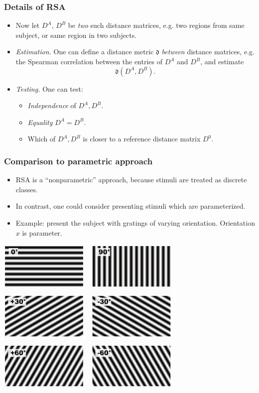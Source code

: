 \documentclass{beamer}
\begin{document}
\begin{frame}
\frametitle{Details of RSA}
\begin{itemize}
\item Now let $D^A$, $D^B$ be \emph{two} such distance matrices, e.g. two regions from same subject, or same region in two subjects.
\item \emph{Estimation.} One can define a distance metric  $\mathfrak{d}$ \emph{between} distance matrices, e.g. the Spearman correlation between the entries of $D^A$ and $D^B$,
and estimate
\[
\mathfrak{d}(D^A, D^B).
\]
\item \emph{Testing.}  One can test:
\begin{itemize}
\item \emph{Independence} of $D^A, D^B$.
\item \emph{Equality} $D^A = D^B$.
\item Which of $D^A, D^B$ is closer to a reference distance matrix $D^0$.
\end{itemize}
\end{itemize}
\end{frame}


\begin{frame}
\frametitle{Comparison to parametric approach}
\begin{itemize}
\item RSA is a ``nonparametric'' approach, because stimuli are treated as discrete classes.
\item In contrast, one could consider presenting stimuli which are parameterized.
\item Example: present the subject with gratings of varying orientation.  Orientation $x$ is parameter.
\end{itemize}
\begin{center}
\includegraphics[scale = 0.2]{grating_angle.png}
\end{center}
\end{frame}
\end{document}
